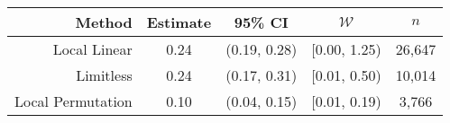 \begin{tabular}{rcccc}
  \hline
Method & Estimate & 95\% CI & $\mathcal{W}$ & $n$ \\
  \hline
Local Linear & 0.24 & (0.19, 0.28) & [0.00, 1.25) & 26,647 \\
  Limitless & 0.24 & (0.17, 0.31) & [0.01, 0.50) & 10,014 \\
  Local Permutation & 0.10 & (0.04, 0.15) & [0.01, 0.19) & 3,766 \\
   \hline
\end{tabular}
